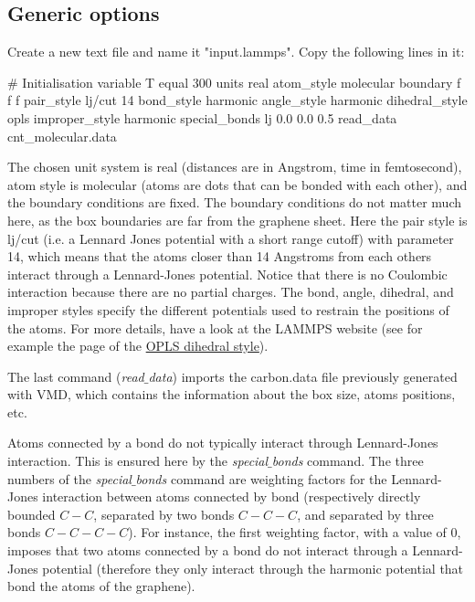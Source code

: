 \subsection{Generic options}

\noindent Create a new text file and name it "input.lammps". Copy the
following lines in it:

\begin{lcverbatim}
# Initialisation
variable T equal 300
units real
atom_style molecular
boundary f f f
pair_style lj/cut 14
bond_style harmonic
angle_style harmonic
dihedral_style opls
improper_style harmonic
special_bonds lj 0.0 0.0 0.5
read_data cnt_molecular.data
\end{lcverbatim}

\noindent The chosen unit system is real (distances are in Angstrom, time in femtosecond),
atom style is molecular (atoms are dots that can be bonded with each other),
and the boundary conditions are fixed. The boundary conditions
do not matter much here, as the box boundaries are far from the graphene sheet. 
Here the pair style is lj/cut (i.e. a Lennard Jones potential 
with a short range cutoff) with
parameter 14, which means that the atoms closer than 14
Angstroms from each others interact through a Lennard-Jones
potential. Notice that there is no Coulombic interaction
because there are no partial charges.
The bond, angle, dihedral, and improper styles specify the
different potentials used to restrain the positions of the
atoms. For more details, have a look at the LAMMPS website
(see for example the page of the \href{https://lammps.sandia.gov/doc/dihedral_opls.html}{OPLS dihedral style}).

The last command (\textit{read$\_$data}) imports the carbon.data file
previously generated with VMD, which contains the
information about the box size, atoms positions, etc.

\begin{tcolorbox}[colback=mylightblue!5!white,colframe=mylightblue!75!black,title=About interaction between neighbors atoms]
Atoms connected by a bond do not typically interact through
Lennard-Jones interaction. This is ensured here by the
\textit{special$\_$bonds} command. The three numbers of the
\textit{special$\_$bonds} command are weighting factors for the
Lennard-Jones interaction between atoms connected by bond
(respectively directly bounded $C-C$, separated by two bonds $C-C-C$,
and separated by three bonds $C-C-C-C$). For instance, the
first weighting factor, with a
value of 0, imposes that two atoms connected by a bond do
not interact through a Lennard-Jones potential (therefore
they only interact through the harmonic potential that bond the atoms
of the graphene).
\end{tcolorbox}

